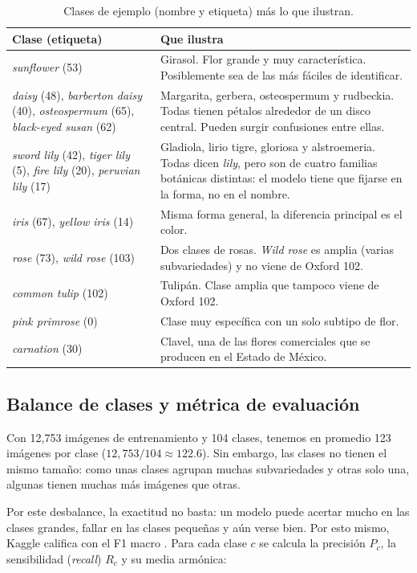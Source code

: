 \begin{table}[htbp]
\centering
\caption{Clases de ejemplo (nombre y etiqueta) más lo que ilustran.}
\label{tab:ejemplos}
\small
\begin{tabular}{p{}p{}}
\hline
Clase (etiqueta) & Que ilustra \\
\hline
\textit{sunflower} (53) & Girasol. Flor grande y muy característica. Posiblemente sea de las más fáciles de identificar. \\
\textit{daisy} (48), \textit{barberton daisy} (40), \textit{osteospermum} (65), \textit{black-eyed susan} (62) & Margarita, gerbera, osteospermum y rudbeckia. Todas tienen pétalos alrededor de un disco central. Pueden surgir confusiones entre ellas. \\
\textit{sword lily} (42), \textit{tiger lily} (5), \textit{fire lily} (20), \textit{peruvian lily} (17) & Gladiola, lirio tigre, gloriosa y alstroemeria. Todas dicen \textit{lily}, pero son de cuatro familias botánicas distintas: el modelo tiene que fijarse en la forma, no en el nombre. \\
\textit{iris} (67), \textit{yellow iris} (14) & Misma forma general, la diferencia principal es el color. \\
\textit{rose} (73), \textit{wild rose} (103) & Dos clases de rosas. \textit{Wild rose} es amplia (varias subvariedades) y no viene de Oxford 102. \\
\textit{common tulip} (102) & Tulipán. Clase amplia que tampoco viene de Oxford 102. \\
\textit{pink primrose} (0) & Clase muy específica con un solo subtipo de flor. \\
\textit{carnation} (30) & Clavel, una de las flores comerciales que se producen en el Estado de México. \\
\hline
\end{tabular}
\end{table}


\subsection{Balance de clases y métrica de evaluación}
Con 12,753 imágenes de entrenamiento y 104 clases, tenemos en promedio 123 imágenes por clase ($12{,}753/104 \approx 122.6$). Sin embargo, las clases no tienen el mismo tamaño: como unas clases agrupan muchas subvariedades y otras solo una, algunas tienen muchas más imágenes que otras.

Por este desbalance, la exactitud no basta: un modelo puede acertar mucho en las clases grandes, fallar en las clases pequeñas y aún verse bien. Por esto mismo, Kaggle califica con el F1 macro \citep{kagglePetalsMetal}. Para cada clase $c$ se calcula la precisión $P_c$, la sensibilidad (\textit{recall}) $R_c$ y su media armónica:

